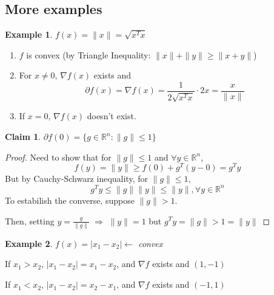 \documentclass[11pt,a4paper]{article}
\newtheorem{example}{Example}
\newtheorem{claim}{Claim}
\begin{document}
\subsection{More examples}
\begin{example}
    $f(x)=\|x\|=\sqrt{x^Tx}$
\end{example}
\begin{enumerate}[$\bullet$]
    \item $f$ is convex (by Triangle Inequality: $\|x\|+\|y\|\geq \|x+y\|$)
    \item For $x\neq 0$, $\nabla f(x)$ exists and $$\partial f(x)= \nabla f(x) =\frac{1}{2\sqrt{x^Tx}}\cdot 2x=\frac{x}{\|x\|}$$
    \item If $x=0$, $\nabla f(x)$ doesn't exist.
\end{enumerate}
\begin{claim}
    $\partial f(0)=\{g\in \mathbb{R}^n:\|g\|\leq 1\}$
\end{claim}
\begin{proof}
    Need to show that for $\|g\|\leq 1$ and $\forall y\in \mathbb{R}^n$, $$f(y)=\|y\|\geq f(0)+g^T(y-0)=g^T y$$
    But by Cauchy-Schwarz inequality, for $\|g\|\leq 1$, $$g^Ty\leq \|g\|\|y\|\leq \|y\|,\forall y\in \mathbb{R}^n$$
    To estabilish the converse, suppose $\|g\|>1$.

    Then, setting $y=\frac{g}{\|g\|}$ $\Rightarrow$ $\|y\|=1$ but $g^Ty=\|g\|>1=\|y\|$
\end{proof}

\begin{example}
    $f(x)=|x_1-x_2|\leftarrow$ convex
\end{example}
If $x_1>x_2$, $|x_1-x_2|=x_1-x_2$, and $\nabla f$ exists and $(1,-1)$

If $x_1<x_2$, $|x_1-x_2|=x_2-x_1$, and $\nabla f$ exists and $(-1,1)$
\end{document}
